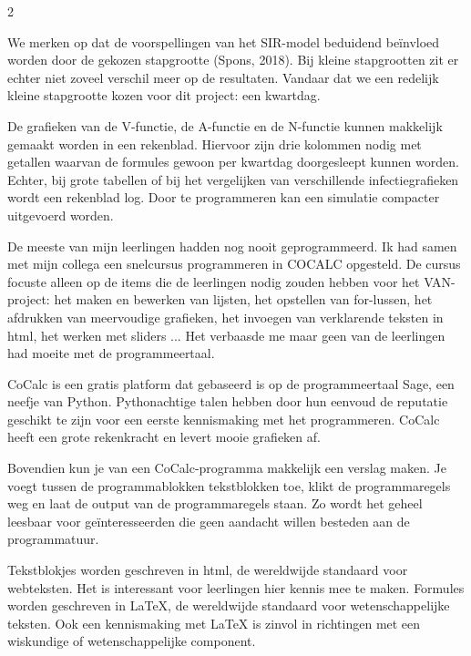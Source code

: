 \begin{multicols}{2}

We merken op dat de voorspellingen van het SIR-model beduidend beïnvloed worden door de gekozen stapgrootte (Spons, 2018). Bij kleine stapgrootten zit er echter niet zoveel verschil meer op de resultaten. Vandaar dat we een redelijk kleine stapgrootte kozen voor dit project: een kwartdag.





De grafieken van de V-functie, de A-functie en de N-functie kunnen makkelijk gemaakt worden in een rekenblad. Hiervoor zijn drie kolommen nodig met getallen waarvan de formules gewoon per kwartdag doorgesleept kunnen worden. Echter, bij grote tabellen of bij het vergelijken van verschillende infectiegrafieken wordt een rekenblad log. Door te programmeren kan een simulatie compacter uitgevoerd worden.

De meeste van mijn leerlingen hadden nog nooit geprogrammeerd. Ik had samen met mijn collega een snelcursus programmeren in COCALC opgesteld. De cursus focuste alleen op de items die de leerlingen nodig zouden hebben voor het VAN-project: het maken en bewerken van lijsten, het opstellen van for-lussen, het afdrukken van meervoudige grafieken, het invoegen van verklarende teksten in html, het werken met sliders ... Het verbaasde me maar geen van de leerlingen had moeite met de programmeertaal. 


CoCalc is een gratis platform dat gebaseerd is op de programmeertaal Sage, een neefje van Python. Pythonachtige talen hebben door hun eenvoud de reputatie geschikt te zijn voor een eerste kennismaking met het programmeren. CoCalc heeft een grote rekenkracht en levert mooie grafieken af. 

Bovendien kun je van een CoCalc-programma makkelijk een verslag maken. Je voegt tussen de programmablokken tekstblokken toe, klikt de programmaregels weg en laat de output van de programmaregels staan. Zo wordt het geheel leesbaar voor geïnteresseerden die geen aandacht willen besteden aan de programmatuur.

Tekstblokjes worden geschreven in html, de wereldwijde standaard voor webteksten. Het is interessant voor leerlingen hier kennis mee te maken. Formules worden geschreven in LaTeX, de wereldwijde standaard voor wetenschappelijke teksten. Ook een kennismaking met LaTeX is zinvol in richtingen met een wiskundige of wetenschappelijke component.
\newpage



\end{multicols}
